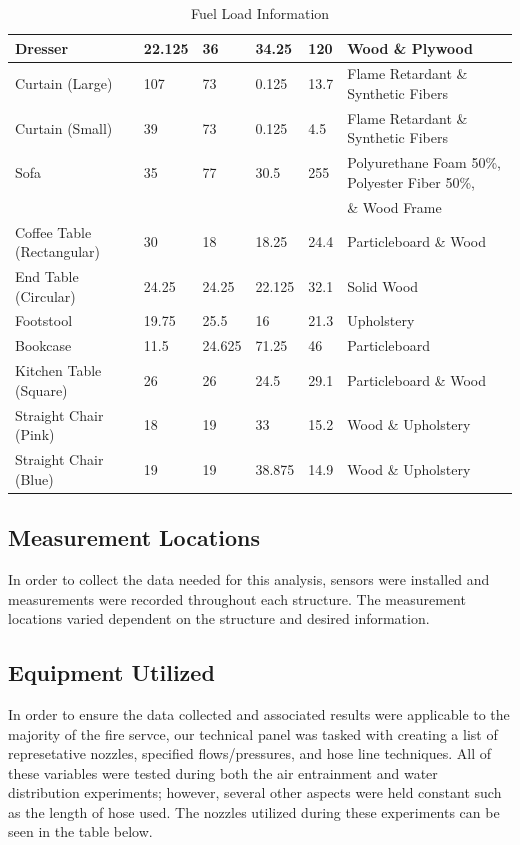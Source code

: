 \documentclass{article}
\begin{document}
\begin{table}
{\begin{tabular}{|l|l|l|l|l|l|}
Dresser & 22.125 & 36 & 34.25 & 120 & Wood \& Plywood \\ \hline
Curtain (Large) & 107 & 73 & 0.125 & 13.7 & Flame Retardant \& Synthetic Fibers \\ \hline
Curtain (Small) & 39 & 73 & 0.125 & 4.5 & Flame Retardant \& Synthetic Fibers \\ \hline
Sofa & 35 & 77 & 30.5 & 255 & Polyurethane Foam 50\%, Polyester Fiber 50\%,\\&&&&& \& Wood Frame \\ \hline
Coffee Table (Rectangular) & 30 & 18 & 18.25 & 24.4 & Particleboard \& Wood \\ \hline
End Table (Circular) & 24.25 & 24.25 & 22.125 & 32.1 & Solid Wood \\ \hline
Footstool & 19.75 & 25.5 & 16 & 21.3 & Upholstery \\ \hline
Bookcase & 11.5 & 24.625 & 71.25 & 46 & Particleboard \\ \hline
Kitchen Table (Square) & 26 & 26 & 24.5 & 29.1 & Particleboard \& Wood \\ \hline
Straight Chair (Pink) & 18 & 19 & 33 & 15.2 & Wood \& Upholstery \\ \hline
Straight Chair (Blue) & 19 & 19 & 38.875 & 14.9 & Wood \& Upholstery \\ \hline
\end{tabular}}
\caption{Fuel Load Information}
\label{table:fuel_weights}
\end{table}

\subsection{Measurement Locations}

In order to collect the data needed for this analysis, sensors were installed and measurements were recorded throughout each structure. The measurement locations varied dependent on the structure and desired information.

\clearpage

\subsection{Equipment Utilized}

In order to ensure the data collected and associated results were applicable to the majority of the fire servce, our technical panel was tasked with creating a list of represetative nozzles, specified flows/pressures, and hose line techniques. All of these variables were tested during both the air entrainment and water distribution experiments; however, several other aspects were held constant such as the length of hose used. The nozzles utilized during these experiments can be seen in the table below.
\end{document}
